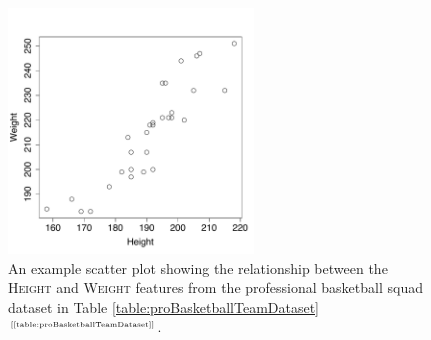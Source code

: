 \documentclass[xcolor={table}]{beamer}
\newcommand{\featN}[1]{\textsc{#1}}
\newcommand{\ourRef}[1]{\ref{#1} $^{\text{\tiny[\pageref{#1}]}}$}
\begin{document}
 \begin{frame} 
\begin{figure}[!htb]
\centering
\includegraphics[width=0.58\textwidth]{images/DataEx-Basketball_Scatter_Height_Weight.pdf}
\caption{An example scatter plot showing the relationship between the \featN{Height} and \featN{Weight} features from the professional basketball squad dataset in Table \ourRef{table:proBasketballTeamDataset}.}
\label{fig:scatterPlotExample}

\end{figure}
\end{frame} 
\end{document}

